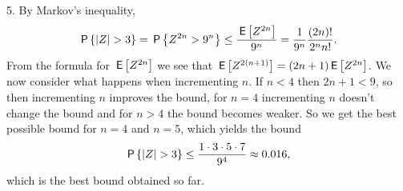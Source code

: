 \begin{exercise}
\begin{solution}
5. By Markov's inequality,
\begin{equation*}
\P{|Z| > 3} = \P{Z^{2n} > 9^n} \leq \frac{\E{Z^{2n}}}{9^n} = \frac{1}{9^n}\frac{(2n)!}{2^{n} n!}.
\end{equation*}
From the formula for $\E{Z^{2n}}$ we see that $\E{Z^{2(n+1)}} = (2n+1)\E{Z^{2n}}$. We now consider what happens when incrementing $n$. If $n < 4$ then $2n+1 < 9$, so then incrementing $n$ improves the bound, for $n=4$ incrementing $n$ doesn't change the bound and for $n >4$ the bound becomes weaker. So we get the best possible bound for $n=4$ and $n=5$, which yields the bound
\begin{equation*}
\P{|Z| > 3} \leq \frac{1 \cdot 3 \cdot 5 \cdot 7}{9^4} \approx 0.016,
\end{equation*}
which is the best bound obtained so far.
\end{solution}
\end{exercise}
